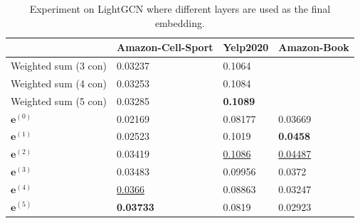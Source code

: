 \begin{table}[]
    \begin{tabular}{|l|l|l|l|}
        \hline
                             & Amazon-Cell-Sport  & Yelp2020           & Amazon-Book         \\ \hline
        Weighted sum (3 con) & 0.03237            & 0.1064             &                     \\ \hline
        Weighted sum (4 con) & 0.03253            & 0.1084             &                     \\ \hline
        Weighted sum (5 con) & 0.03285            & \textbf{0.1089}    &                     \\ \hline
        $\mathbf{e}^{(0)}$   & 0.02169            & 0.08177            & 0.03669             \\ \hline
        $\mathbf{e}^{(1)}$   & 0.02523            & 0.1019             & \textbf{0.0458}     \\ \hline
        $\mathbf{e}^{(2)}$   & 0.03419            & \underline{0.1086} & \underline{0.04487} \\ \hline
        $\mathbf{e}^{(3)}$   & 0.03483            & 0.09956            & 0.0372              \\ \hline
        $\mathbf{e}^{(4)}$   & \underline{0.0366} & 0.08863            & 0.03247             \\ \hline
        $\mathbf{e}^{(5)}$   & \textbf{0.03733}   & 0.0819             & 0.02923             \\ \hline
    \end{tabular}
    \centering
    \caption{Experiment on LightGCN where different layers are used as the final embedding.}
    \label{tab:only-use-one-layer-experiment}
\end{table}